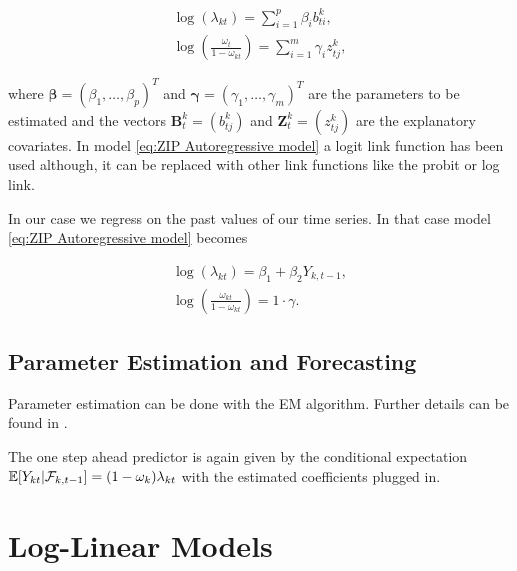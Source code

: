 \begin{equation}
\begin{gathered}
\log(\lambda_{kt}) = \sum_{i=1}^p\beta_i b^k_{ti},\\ %
\log\left(\frac{\omega_{t}}{1-\omega_{kt}}\right)=\sum_{i=1}^m\gamma_i z^k_{tj},%
\label{eq:ZIP Autoregressive model}
\end{gathered}
\end{equation}

where $\bm{\beta} = (\beta_1,\ldots,\beta_p)^T$ and $\bm{\gamma}=(\gamma_1,\ldots,\gamma_m)^T$ are the parameters to be estimated and the vectors $\bm{B}^k_t=(b^k_{tj})$ and $\bm{Z}^k_{t}=(z^k_{tj})$ are the explanatory covariates. In model \ref{eq:ZIP Autoregressive model} a logit link function has been used although, it can be replaced with other link functions like the probit or log link. 

In our case we regress on the past values of our time series. In that case model \ref{eq:ZIP Autoregressive model} becomes

\begin{equation}
\begin{gathered}
\log(\lambda_{kt}) = \beta_1 + \beta_2 Y_{k,t-1},\\%
\log\left(\frac{\omega_{kt}}{1-\omega_{kt}}\right)= 1 \cdot \gamma.
\label{eq:ZIP Autoregressive model timeseries}
\end{gathered}
\end{equation}


\subsection{Parameter Estimation and Forecasting}
\label{sec: ZIM Parameter Estimation and Forecasting}

Parameter estimation can be done with the EM algorithm. Further details can be found in \cite{Lambert:1992}.

The one step ahead predictor is again given by the conditional expectation $\mathbb{E}[Y_{kt} | \mathcal{F}_{k,t-1}] = (1-\omega_k)\lambda_{kt} $ with the estimated coefficients plugged in. 

\section{Log-Linear Models}
\label{sec: Log-Linear Models}

